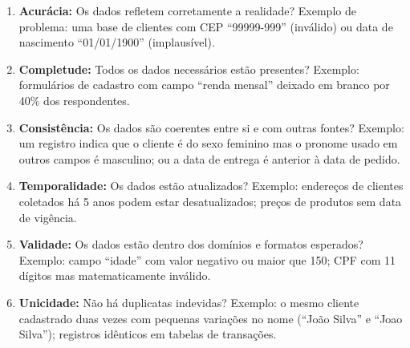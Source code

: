 \documentclass[12pt,a4paper]{article}
\begin{document}
\begin{enumerate}[leftmargin=*]
  \item \textbf{Acurácia:} Os dados refletem corretamente a realidade? Exemplo de problema: uma base de clientes com CEP ``99999-999'' (inválido) ou data de nascimento ``01/01/1900'' (implausível).

  \item \textbf{Completude:} Todos os dados necessários estão presentes? Exemplo: formulários de cadastro com campo ``renda mensal'' deixado em branco por 40\% dos respondentes.

  \item \textbf{Consistência:} Os dados são coerentes entre si e com outras fontes? Exemplo: um registro indica que o cliente é do sexo feminino mas o pronome usado em outros campos é masculino; ou a data de entrega é anterior à data de pedido.

  \item \textbf{Temporalidade:} Os dados estão atualizados? Exemplo: endereços de clientes coletados há 5 anos podem estar desatualizados; preços de produtos sem data de vigência.

  \item \textbf{Validade:} Os dados estão dentro dos domínios e formatos esperados? Exemplo: campo ``idade'' com valor negativo ou maior que 150; CPF com 11 dígitos mas matematicamente inválido.

  \item \textbf{Unicidade:} Não há duplicatas indevidas? Exemplo: o mesmo cliente cadastrado duas vezes com pequenas variações no nome (``João Silva'' e ``Joao Silva''); registros idênticos em tabelas de transações.
\end{enumerate}

\end{document}

